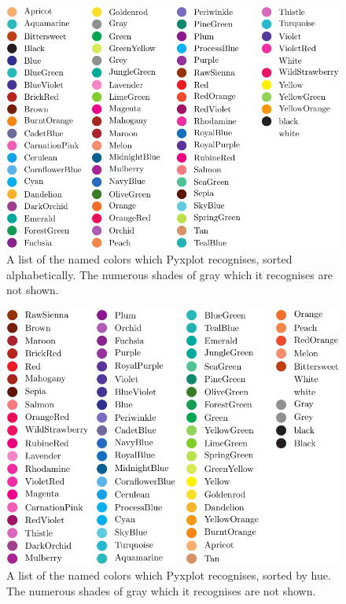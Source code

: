 \begin{figure}
\begin{center}
\includegraphics[width=\textwidth]{figures/pyx_colors2}
\end{center}
\caption[A list of the named colors which Pyxplot recognises, sorted alphabetically]
{A list of the named colors which Pyxplot recognises, sorted alphabetically. The numerous shades of gray which it recognises are not shown.}
\label{fig:color_table1}
\end{figure}

\begin{figure}
\begin{center}
\includegraphics[width=\textwidth]{figures/pyx_colors3}
\end{center}
\caption[A list of the named colors which Pyxplot recognises, sorted by hue]
{A list of the named colors which Pyxplot recognises, sorted by hue. The numerous shades of gray which it recognises are not shown.}
\label{fig:color_table2}
\end{figure}

